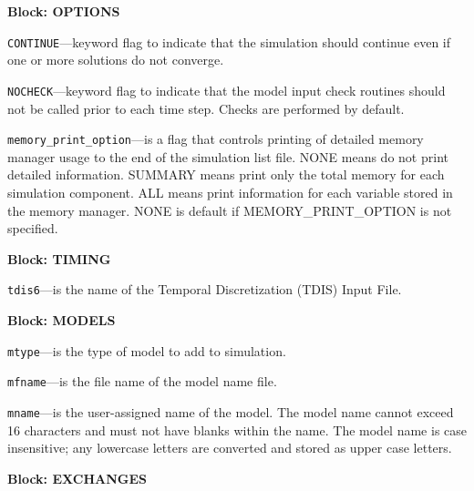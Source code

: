 
\item \textbf{Block: OPTIONS}

\begin{description}
\item \texttt{CONTINUE}---keyword flag to indicate that the simulation should continue even if one or more solutions do not converge.

\item \texttt{NOCHECK}---keyword flag to indicate that the model input check routines should not be called prior to each time step. Checks are performed by default.

\item \texttt{memory\_print\_option}---is a flag that controls printing of detailed memory manager usage to the end of the simulation list file.  NONE means do not print detailed information. SUMMARY means print only the total memory for each simulation component. ALL means print information for each variable stored in the memory manager. NONE is default if MEMORY\_PRINT\_OPTION is not specified.

\end{description}
\item \textbf{Block: TIMING}

\begin{description}
\item \texttt{tdis6}---is the name of the Temporal Discretization (TDIS) Input File.

\end{description}
\item \textbf{Block: MODELS}

\begin{description}
\item \texttt{mtype}---is the type of model to add to simulation.

\item \texttt{mfname}---is the file name of the model name file.

\item \texttt{mname}---is the user-assigned name of the model.  The model name cannot exceed 16 characters and must not have blanks within the name.  The model name is case insensitive; any lowercase letters are converted and stored as upper case letters.

\end{description}
\item \textbf{Block: EXCHANGES}

